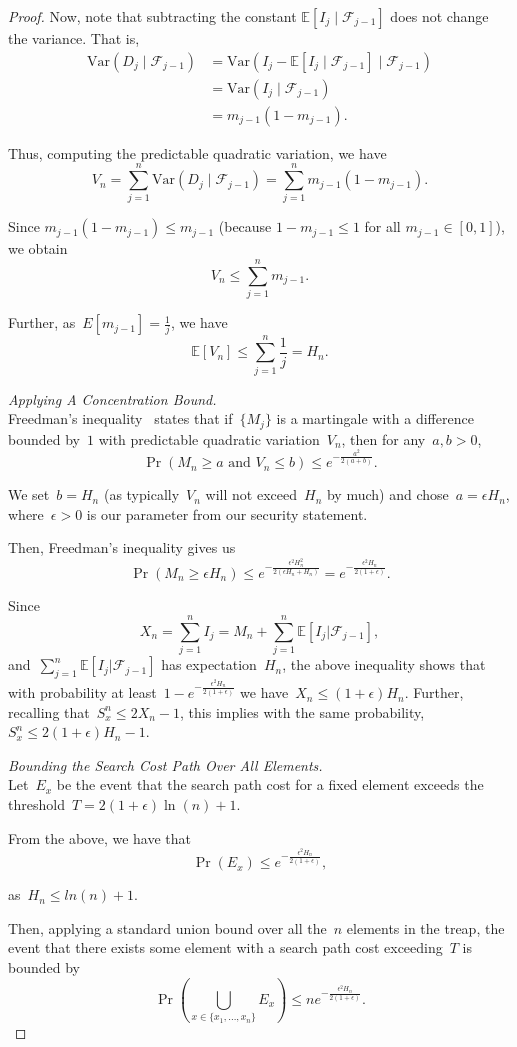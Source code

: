\begin{proof}
Now, note that subtracting the constant $\mathbb{E}[I_j\mid \mathcal{F}_{j-1}]$ does not change the variance. That is,
\begin{align*}
    \mathrm{Var}(D_j\mid \mathcal{F}_{j-1}) &= \mathrm{Var}(I_j - \mathbb{E}[I_j\mid \mathcal{F}_{j-1}]\mid \mathcal{F}_{j-1})\\
&= \mathrm{Var}(I_j\mid \mathcal{F}_{j-1})\\
&= m_{j-1}(1-m_{j-1}).
\end{align*}

Thus, computing the predictable quadratic variation, we have
$$V_n = \sum_{j=1}^{n} \mathrm{Var}(D_j\mid \mathcal{F}_{j-1}) = \sum_{j=1}^{n} m_{j-1}(1-m_{j-1}).$$

Since $m_{j-1}(1-m_{j-1}) \leq m_{j-1}$ (because $1-m_{j-1}\le 1$ for all $m_{j-1}\in [0,1]$), we obtain
$$V_n \le \sum_{j=1}^{n} m_{j-1}.$$

Further, as~$E[m_{j-1}] = \frac{1}{j}$, we have
$$\mathbb{E}[V_n] \leq \sum_{j=1}^{n} \frac{1}{j} = H_n.$$

\textit{Applying A Concentration Bound.}\\

Freedman's inequality~\cite{freedman1975tail} states that if~$\{M_j\}$ is a martingale with a difference bounded by~$1$ with predictable quadratic variation~$V_n$, then for any~$a,b>0$,
$$\Pr(M_{n} \geq a \text{ and } V_n \leq b) \leq e^{-\frac{a^{2}}{2(a+b)}}.$$

We set~$b = H_n$ (as typically~$V_n$ will not exceed~$H_n$ by much) and chose~$a = \epsilon H_n$, where~$\epsilon > 0$ is our parameter from our security statement. 

Then, Freedman's inequality gives us
$$\Pr(M_n \geq \epsilon H_n) \leq  e^{-\frac{\epsilon^2H_{n}^{2}}{2(\epsilon H_n+H_n)}} = e^{-\frac{\epsilon^2 H_{n}}{2(1 + \epsilon)}}.$$

Since
$$X_n = \sum_{j=1}^{n} I_j = M_n + \sum_{j=1}^{n} \mathbb{E}[I_j | \mathcal{F}_{j-1}],$$
and~$\sum_{j=1}^{n} \mathbb{E}[I_j | \mathcal{F}_{j-1}]$ has expectation~$H_n$, the above inequality shows that with probability at least~$1 - e^{-\frac{\epsilon^2 H_{n}}{2(1 + \epsilon)}}$ we have~$X_n \leq (1+ \epsilon)H_n$. Further, recalling that~$S^{n}_{x} \leq 2X_n -1$, this implies with the same probability, $S^{n}_{x} \leq 2(1+\epsilon)H_n-1$.

\textit{Bounding the Search Cost Path Over All Elements.} \\

Let~$E_x$ be the event that the search path cost for a fixed element exceeds the threshold~$T = 2(1+\epsilon) \ln(n) + 1$. 

From the above, we have that
$$ \Pr(E_x) \leq e^{-\frac{\epsilon^2 H_{n}}{2(1 + \epsilon)}},$$

as~$H_n \leq ln(n) + 1$.

Then, applying a standard union bound over all the~$n$ elements in the treap, the event that there exists some element with a search path cost exceeding~$T$ is bounded by 
$$\Pr \left(\bigcup_{x \in \{x_1,\ldots,x_n \}} E_x  \right) \leq n e^{-\frac{\epsilon^2 H_{n}}{2(1 + \epsilon)}}.$$
\end{proof}


